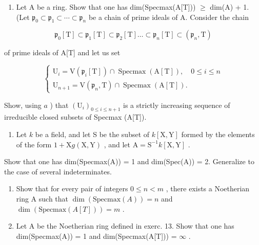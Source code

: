 \begin{enumerate}
\def\labelenumi{\alph{enumi})}
\setcounter{enumi}{1}
\tightlist
\item
  Let A be a ring. Show that one has dim(Specmax(A{[}T{]})) \(\geqslant\) dim(A) + 1. (Let \(\mathfrak{p}_0\subset \mathfrak{p}_1\subset \cdots \subset \mathfrak{p}_n\) be a chain of prime ideals of A. Consider the chain
\end{enumerate}

\[
\mathfrak {p} _ {0} [ \mathrm{T} ] \subset \mathfrak {p} _ {1} [ \mathrm{T} ] \subset \mathfrak {p} _ {2} [ \mathrm{T} ] \dots \subset \mathfrak {p} _ {n} [ \mathrm{T} ] \subset (\mathfrak {p} _ {n}, \mathrm{T})
\]

of prime ideals of A{[}T{]} and let us set

\[
\left\{ \begin{array}{l} \mathrm{U} _ {i} = \mathrm{V} (\mathfrak {p} _ {i} [ \mathrm{T} ]) \cap \operatorname{Specmax} (\mathrm{A} [ \mathrm{T} ]), \quad 0 \leqslant i \leqslant n \\ \mathrm{U} _ {n + 1} = \mathrm{V} (\mathfrak {p} _ {n}, \mathrm{T}) \cap \operatorname{Specmax} (\mathrm{A} [ \mathrm{T} ]). \end{array} \right.
\]

Show, using \(a\) ) that \((\mathrm{U}_i)_{0 \leqslant i \leqslant n+1}\) is a strictly increasing sequence of irreducible closed subsets of Specmax (A{[}T{]}).

\begin{enumerate}
\def\labelenumi{\alph{enumi})}
\setcounter{enumi}{2}
\tightlist
\item
  Let \(k\) be a field, and let S be the subset of \(k[\mathrm{X}, \mathrm{Y}]\) formed by the elements of the form \(1 + \mathrm{X}g(\mathrm{X}, \mathrm{Y})\) , and let \(\mathrm{A} = \mathrm{S}^{-1}k[\mathrm{X}, \mathrm{Y}]\) .
\end{enumerate}

Show that one has dim(Specmax(A)) = 1 and dim(Spec(A)) = 2. Generalize to the case of several indeterminates.

\begin{enumerate}
\def\labelenumi{\alph{enumi})}
\setcounter{enumi}{3}
\item
  Show that for every pair of integers \(0 \leqslant n < m\) , there exists a Noetherian ring A such that \(\dim(\text{Specmax}(A)) = n\) and \(\dim(\text{Specmax}(A[T])) = m\) .
\item
  Let A be the Noetherian ring defined in exerc. 13. Show that one has dim(Specmax(A)) = 1 and dim(Specmax(A{[}T{]})) = \(\infty\) .
\end{enumerate}


